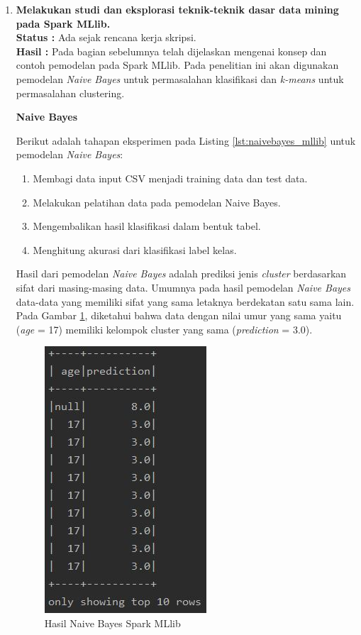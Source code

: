 \documentclass[a4paper,twoside]{article}
\begin{document}
\begin{enumerate}
		\item \textbf{Melakukan studi dan eksplorasi teknik-teknik dasar data mining pada Spark MLlib.}\\
		{\bf Status :} Ada sejak rencana kerja skripsi.\\
		{\bf Hasil :} Pada bagian sebelumnya telah dijelaskan mengenai konsep dan contoh pemodelan pada Spark MLlib. Pada penelitian ini akan digunakan pemodelan \textit{Naive Bayes} untuk permasalahan klasifikasi dan \textit{k-means} untuk permasalahan clustering.

\newpage
\textbf{Naive Bayes}

\noindent Berikut adalah tahapan eksperimen pada Listing \ref{lst:naivebayes_mllib} untuk pemodelan \textit{Naive Bayes}:
\begin{enumerate}
\item Membagi data input CSV menjadi training data dan test data.
\item Melakukan pelatihan data pada pemodelan Naive Bayes.
\item Mengembalikan hasil klasifikasi dalam bentuk tabel.
\item Menghitung akurasi dari klasifikasi label kelas.
\end{enumerate}	

\par Hasil dari pemodelan \textit{Naive Bayes} adalah prediksi jenis \textit{cluster} berdasarkan sifat dari masing-masing data. Umumnya pada hasil pemodelan \textit{Naive Bayes} data-data yang memiliki sifat yang sama letaknya berdekatan satu sama lain. Pada Gambar \ref{fig:mllib_naivebayes}, diketahui bahwa data dengan nilai umur yang sama yaitu (\textit{age} = 17) memiliki kelompok cluster yang sama (\textit{prediction} = 3.0).

\begin{figure}[H]
	\centering
	\includegraphics[scale=0.7]{mllib_naivebayes}
	\caption{Hasil Naive Bayes Spark MLlib}
	\label{fig:mllib_naivebayes}
\end{figure}


\end{enumerate}
\end{document}
